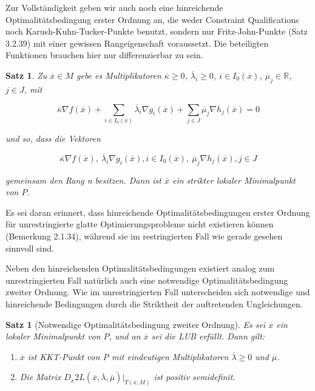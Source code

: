 \documentclass[11pt]{scrreprt}
\newcounter{thm}
\theoremstyle{thmstyle}
\numberwithin{thm}{section}
\newtheorem{satz}[thm]{Satz}
\begin{document}
Zur Vollständigkeit geben wir auch noch eine hinreichende Optimalitätsbedingung erster Ordnung an, die weder Constraint Qualifications noch Karush-Kuhn-Tucker-Punkte benutzt, sondern nur Fritz-John-Punkte (Satz 3.2.39) mit einer gewissen Rangeigenschaft voraussetzt. Die beteiligten Funktionen brauchen hier nur differenzierbar zu sein.

\begin{satz}
	Zu $\overline{x} \in M$ gebe es Multiplikatoren $\overline{\kappa} \geq 0$, $\overline{\lambda}_i \geq 0$, $i \in I_0(\overline{x})$, $\overline{\mu}_j \in \mathbb{R}$, $j \in J$, mit 
	
	$$ \overline{\kappa} \nabla f(\overline{x}) + \sum_{i \in I_0(\overline{x})} \overline{\lambda}_i \nabla g_i(\overline{x}) + \sum_{j \in J} \overline{\mu}_j \nabla h_j(\overline{x}) = 0 $$
		
	und so, dass die Vektoren 
	
		$$ \overline{\kappa} \nabla f(\overline{x}), ~ \overline{\lambda}_i \nabla g_i(\overline{x}), i \in I_0(\overline{x}), ~ \overline{\mu}_j \nabla h_j(\overline{x}) , j \in J $$
		
	gemeinsam den Rang n besitzen. Dann ist $\overline{x}$ ein strikter lokaler Minimalpunkt von $P$.
\end{satz}

Es sei daran erinnert, dass hinreichende Optimalitätsbedingungen erster Ordnung für unrestringierte glatte Optimierungsprobleme nicht existieren können (Bemerkung 2.1.34), während sie im restringierten Fall wie gerade gesehen sinnvoll sind. ~\bigskip

Neben den hinreichenden Optimalitätsbedingungen existiert analog zum unrestringierten Fall natürlich auch eine notwendige Optimalitätsbedingung zweiter Ordnung. Wie im unrestringierten Fall unterscheiden sich notwendige und hinreichende Bedingungen durch die Striktheit der auftretenden Ungleichungen.

\begin{satz}[Notwendige Optimalitätsbedingung zweiter Ordnung]
	Es sei $\overline{x}$ ein lokaler Minimalpunkt von $P$, und an $\overline{x}$ sei die LUB erfüllt. Dann gilt:
	\begin{enumerate}[label=\alph*\upshape)]
		\item $\overline{x}$ ist KKT-Punkt von P mit eindeutigen Multiplikatoren $\overline{\lambda} \geq 0$ und $\overline{\mu}$.
		\item Die Matrix $D_x2 L(\overline{x}, \overline{\lambda}, \overline{\mu}) |_{T(\overline{x},M)}$ ist positiv semidefinit.
	\end{enumerate}
\end{satz}
\end{document}
